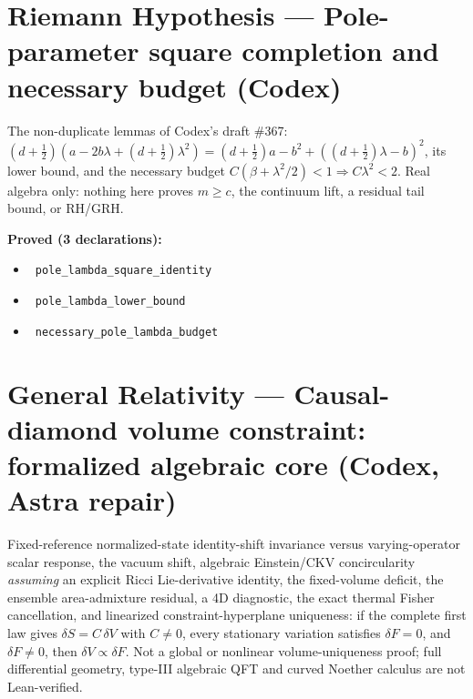\documentclass{report}
\theoremstyle{definition}
\begin{document}
\begin{itemize}
\section{Riemann Hypothesis --- Pole-parameter square completion and necessary budget (Codex)}
The non-duplicate lemmas of Codex's draft \#367: $(d+\tfrac12)(a-2b\lambda+(d+\tfrac12)\lambda^2)=(d+\tfrac12)a-b^2+((d+\tfrac12)\lambda-b)^2$, its lower bound, and the necessary budget $C(\beta+\lambda^2/2)<1\Rightarrow C\lambda^2<2$. Real algebra only: nothing here proves $m\ge c$, the continuum lift, a residual tail bound, or RH/GRH.

\noindent\textbf{Proved (3 declarations):}
\begin{itemize}
  \item {}\leanok\ \texttt{pole\_lambda\_square\_identity}
  \item {}\leanok\ \texttt{pole\_lambda\_lower\_bound}
  \item {}\leanok\ \texttt{necessary\_pole\_lambda\_budget}
\end{itemize}

\section{General Relativity --- Causal-diamond volume constraint: formalized algebraic core (Codex, Astra repair)}
Fixed-reference normalized-state identity-shift invariance versus varying-operator scalar response, the vacuum shift, algebraic Einstein/CKV concircularity \emph{assuming} an explicit Ricci Lie-derivative identity, the fixed-volume deficit, the ensemble area-admixture residual, a 4D diagnostic, the exact thermal Fisher cancellation, and linearized constraint-hyperplane uniqueness: if the complete first law gives $\delta S=C\,\delta V$ with $C\ne0$, every stationary variation satisfies $\delta F=0$, and $\delta F\ne0$, then $\delta V\propto\delta F$. Not a global or nonlinear volume-uniqueness proof; full differential geometry, type-III algebraic QFT and curved Noether calculus are not Lean-verified.


\end{itemize}
\end{document}
